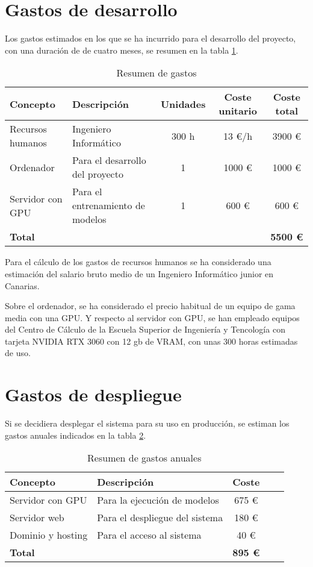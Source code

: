\section{Gastos de desarrollo}
Los gastos estimados en los que se ha incurrido para el desarrollo del proyecto, con una duración de de cuatro meses,
 se resumen en la tabla \ref{tabla_presupuesto_desarrollo}. 

\begin{table}[h]
   \centering
   \small
   \caption{Resumen de gastos}
   \begin{tabular}{|l|l|c|c|c|}
      \hline
      \textbf{Concepto} & \textbf{Descripción} & \textbf{Unidades} & \textbf{Coste unitario} & \textbf{Coste total} \\ \hline
      Recursos humanos & Ingeniero Informático & 300 h & 13 €/h & 3900 € \\ \hline
      Ordenador & Para el desarrollo del proyecto & 1 & 1000 € & 1000 € \\ \hline
      Servidor con GPU & Para el entrenamiento de modelos & 1 & 600 € & 600 € \\ \hline
      \textbf{Total} & & & & \textbf{5500 €} \\ \hline
   \end{tabular}
   \label{tabla_presupuesto_desarrollo}
\end{table}

Para el cálculo de los gastos de recursos humanos se ha considerado una estimación del salario bruto medio de un Ingeniero Informático junior en Canarias.

Sobre el ordenador, se ha considerado el precio habitual de un equipo de gama media con una GPU. Y respecto al servidor con GPU, se han empleado equipos del 
Centro de Cálculo de la Escuela Superior de Ingeniería y Tencología con tarjeta NVIDIA RTX 3060 con 12 gb de VRAM, con unas 300 horas estimadas de uso.

\section{Gastos de despliegue}
Si se decidiera desplegar el sistema para su uso en producción, se estiman los gastos anuales indicados
en la tabla \ref{tabla_presupuesto_despliegue}.

\begin{table}[h]
   \centering
   \small
   \caption{Resumen de gastos anuales}
   \begin{tabular}{|l|l|c|c|c|}
      \hline
      \textbf{Concepto} & \textbf{Descripción} & \textbf{Coste} \\ \hline
      Servidor con GPU & Para la ejecución de modelos  & 675 € \\ \hline
      Servidor web & Para el despliegue del sistema  & 180 € \\ \hline
      Dominio y hosting & Para el acceso al sistema  & 40 € \\ \hline
      \textbf{Total}  & & \textbf{895 €} \\ \hline
   \end{tabular}
   \label{tabla_presupuesto_despliegue}
\end{table}

